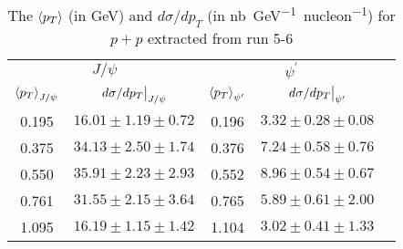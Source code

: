 \documentclass[../main.tex]{subfiles}
\begin{document}
\begin{table}[h!]
	\centering
	\caption{The $\expval{p_T}$ (in \unit{\GeV}) and  $d\sigma/dp_T$ (in \unit{\nano\barn\GeV^{-1} nucleon^{-1}}) for $p+p$ extracted from run 5-6}
	\begin{tabular}{cc|ccc}
		\hline
		\multicolumn{2}{c|}{$J/\psi$} & \multicolumn{2}{c}{$\psi^{\prime}$} &                                                                      \\ \cline{1-4}
		$\expval{p_T}_{J/\psi}$       & $\eval{d\sigma/dp_T}_{J/\psi}$      & $\expval{p_T}_{\psi^\prime}$ & $\eval{d\sigma/dp_T}_{\psi^\prime}$ & \\ \cline{1-4}
		\multicolumn{1}{c|}{0.195}    & $16.01\pm1.19\pm0.72$               & \multicolumn{1}{c|}{0.196}   & $3.32\pm0.28\pm0.08$                & \\
		\multicolumn{1}{c|}{0.375}    & $34.13\pm2.50\pm1.74$               & \multicolumn{1}{c|}{0.376}   & $7.24\pm0.58\pm0.76$                & \\
		\multicolumn{1}{c|}{0.550}    & $35.91\pm2.23\pm2.93$               & \multicolumn{1}{c|}{0.552}   & $8.96\pm0.54\pm0.67$                & \\
		\multicolumn{1}{c|}{0.761}    & $31.55\pm2.15\pm3.64$               & \multicolumn{1}{c|}{0.765}   & $5.89\pm0.61\pm2.00$                & \\
		\multicolumn{1}{c|}{1.095}    & $16.19\pm1.15\pm1.42$               & \multicolumn{1}{c|}{1.104}   & $3.02\pm0.41\pm1.33$                & \\ \cline{1-4}
	\end{tabular}
\end{table}
\end{document}
